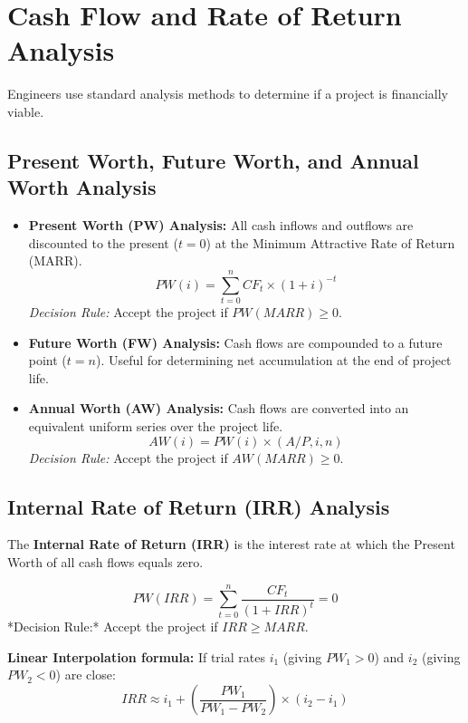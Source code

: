 \documentclass[12pt,a4paper]{article}
\begin{document}
\section{Cash Flow and Rate of Return Analysis}

Engineers use standard analysis methods to determine if a project is financially viable.

\subsection{Present Worth, Future Worth, and Annual Worth Analysis}
\begin{itemize}[leftmargin=*, itemsep=6pt]
  \item \textbf{Present Worth (PW) Analysis:} All cash inflows and outflows are discounted to the present ($t=0$) at the Minimum Attractive Rate of Return (MARR).
    \begin{equation}
      PW(i) = \sum_{t=0}^{n} CF_t \times (1 + i)^{-t}
    \end{equation}
    \textit{Decision Rule:} Accept the project if $PW(MARR) \ge 0$.
  \item \textbf{Future Worth (FW) Analysis:} Cash flows are compounded to a future point ($t=n$). Useful for determining net accumulation at the end of project life.
  \item \textbf{Annual Worth (AW) Analysis:} Cash flows are converted into an equivalent uniform series over the project life.
    \begin{equation}
      AW(i) = PW(i) \times (A/P, i, n)
    \end{equation}
    \textit{Decision Rule:} Accept the project if $AW(MARR) \ge 0$.
\end{itemize}

\subsection{Internal Rate of Return (IRR) Analysis}
The \textbf{Internal Rate of Return (IRR)} is the interest rate at which the Present Worth of all cash flows equals zero.

\begin{tcolorbox}[formulabox, title={\textbf{IRR Equation}}]
\begin{equation}
  PW(IRR) = \sum_{t=0}^{n} \frac{CF_t}{(1 + IRR)^t} = 0
\end{equation}
*Decision Rule:* Accept the project if $IRR \ge MARR$.
\par\vspace{3pt}
\textbf{Linear Interpolation formula:} If trial rates $i_1$ (giving $PW_1 > 0$) and $i_2$ (giving $PW_2 < 0$) are close:
\begin{equation}
  IRR \approx i_1 + \left( \frac{PW_1}{PW_1 - PW_2} \right) \times (i_2 - i_1)
\end{equation}
\end{tcolorbox}
\end{document}
